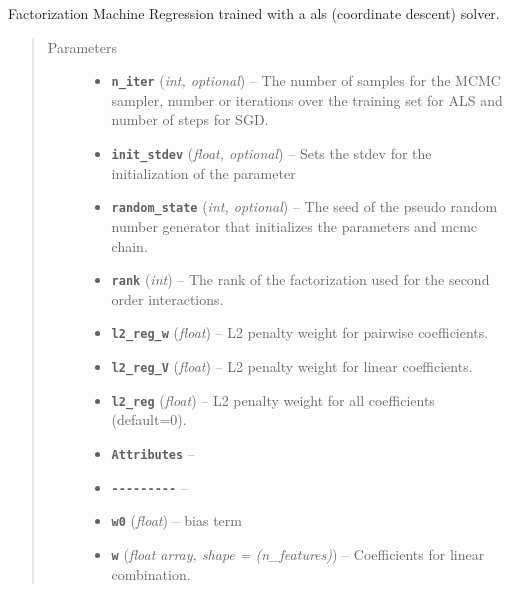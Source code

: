 \documentclass[letterpaper,10pt,english]{sphinxmanual}
\begin{document}
\begin{fulllineitems}
\label{api:fastFM.als.FMRegression}
Factorization Machine Regression trained with a als (coordinate descent)
solver.
\begin{quote}\begin{description}
\item[{Parameters}] \leavevmode\begin{itemize}
\item {} 
\textbf{\texttt{n\_iter}} (\emph{int, optional}) -- The number of samples for the MCMC sampler, number or iterations over
the training set for ALS and number of steps for SGD.

\item {} 
\textbf{\texttt{init\_stdev}} (\emph{float, optional}) -- Sets the stdev for the initialization of the parameter

\item {} 
\textbf{\texttt{random\_state}} (\emph{int, optional}) -- The seed of the pseudo random number generator that
initializes the parameters and mcmc chain.

\item {} 
\textbf{\texttt{rank}} (\emph{int}) -- The rank of the factorization used for the second order interactions.

\item {} 
\textbf{\texttt{l2\_reg\_w}} (\emph{float}) -- L2 penalty weight for pairwise coefficients.

\item {} 
\textbf{\texttt{l2\_reg\_V}} (\emph{float}) -- L2 penalty weight for linear coefficients.

\item {} 
\textbf{\texttt{l2\_reg}} (\emph{float}) -- L2 penalty weight for all coefficients (default=0).

\item {} 
\textbf{\texttt{Attributes}} -- 

\item {} 
\textbf{\texttt{-{-}-{-}-{-}-{-}-}} -- 

\item {} 
\textbf{\texttt{w0}} (\emph{float}) -- bias term

\item {} 
\textbf{\texttt{w}} (\emph{float \textbar{} array, shape = (n\_features)}) -- Coefficients for linear combination.


\end{itemize}
\end{description}
\end{quote}
\end{fulllineitems}
\end{document}

